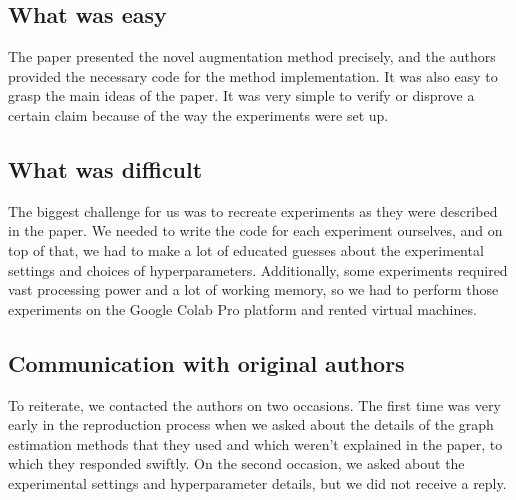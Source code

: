 \subsection{What was easy}



The paper presented the novel augmentation method precisely, and the authors provided the necessary code for the method implementation. It was also easy to grasp the main ideas of the paper. It was very simple to verify or disprove a certain claim because of the way the experiments were set up.

\subsection{What was difficult}
The biggest challenge for us was to recreate experiments as they were described in the paper. We needed to write the code for each experiment ourselves, and on top of that, we had to make a lot of educated guesses about the experimental settings and choices of hyperparameters. Additionally, some experiments required vast processing power and a lot of working memory, so we had to perform those experiments on the Google Colab Pro platform and rented virtual machines.

\subsection{Communication with original authors}
To reiterate, we contacted the authors on two occasions. The first
time was very early in the reproduction process when we asked about the details of the graph estimation methods that they used and which weren’t explained in the paper, to which they responded swiftly. On the second occasion, we asked about the experimental settings and hyperparameter details, but we did not receive a reply.
\newpage